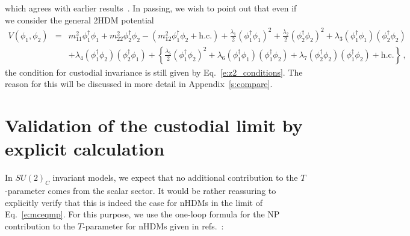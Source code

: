 \documentclass[11pt]{article}
\begin{document}
%
which agrees with earlier results~\cite{Pomarol:1993mu,Haber:2010bw,Darvishi:2019dbh}.
In passing, we wish to point out that even if we consider the general 2HDM potential~\cite{Branco:2011iw} %
%
\begin{eqnarray}
	\label{e:2hdmpot1}
	V(\phi_1, \phi_2) &=& m_{11}^2 \phi_1^\dagger \phi_1 + m_{22}^2\phi_2^\dagger \phi_2 - (m_{12}^2 \phi_1^\dagger \phi_2 + \text{h.c.}) + \frac{\lambda_1}{2}(\phi_1^\dagger \phi_1)^2 + \frac{\lambda_2}{2}(\phi_2^\dagger \phi_2)^2+ \lambda_3 (\phi_1^\dagger \phi_1)(\phi_2^\dagger \phi_2)  \nonumber \\
	&& + \lambda_4(\phi_1^\dagger \phi_2)(\phi_2^\dagger \phi_1) + \left\{ \frac{\lambda_5}{2} (\phi_1^\dagger \phi_2)^2 +\lambda_6(\phi_1^\dagger \phi_1)(\phi_1^\dagger \phi_2)+\lambda_7(\phi_2^\dagger \phi_2)(\phi_1^\dagger \phi_2)+\text{h.c.} \right\}\, , 
\end{eqnarray}
%
the condition for custodial invariance is still given by  Eq.~\eqref{e:z2_conditions}.  
The reason for this will be discussed in more detail in Appendix~\ref{s:compare}.  




\section{Validation of the custodial limit by explicit calculation}
\label{s:tparameter}
%
In $SU(2)_C$ invariant models, we expect that no additional contribution to the $T$-parameter comes from the scalar sector.  
It would be rather reassuring to explicitly verify that this is indeed the case for nHDMs in the limit of Eq.~\eqref{e:mceqmp}. For this purpose,  we use the one-loop formula for the NP contribution to the $T$-parameter for nHDMs given in refs.~\cite{Grimus:2007if, Grimus:2008nb}:  
\end{document}
